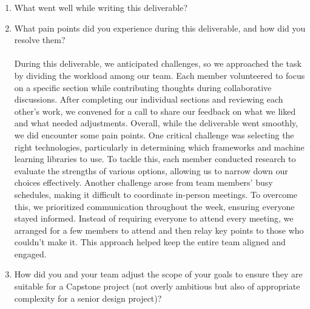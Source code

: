 \documentclass{article}
\begin{document}
\begin{enumerate}
    \item What went well while writing this deliverable? 
    \item What pain points did you experience during this deliverable, and how
    did you resolve them? \\ \\
    During this deliverable, we anticipated challenges, so we approached the task by dividing the workload among our team. Each member volunteered to focus on a specific section while contributing thoughts during collaborative discussions. After completing our individual sections and reviewing each other's work, we convened for a call to share our feedback on what we liked and what needed adjustments. Overall, while the deliverable went smoothly, we did encounter some pain points. One critical challenge was selecting the right technologies, particularly in determining which frameworks and machine learning libraries to use. To tackle this, each member conducted research to evaluate the strengths of various options, allowing us to narrow down our choices effectively. Another challenge arose from team members' busy schedules, making it difficult to coordinate in-person meetings. To overcome this, we prioritized communication throughout the week, ensuring everyone stayed informed. Instead of requiring everyone to attend every meeting, we arranged for a few members to attend and then relay key points to those who couldn't make it. This approach helped keep the entire team aligned and engaged.
    \item How did you and your team adjust the scope of your goals to ensure
    they are suitable for a Capstone project (not overly ambitious but also of
    appropriate complexity for a senior design project)?
\end{enumerate}  
\end{document}
